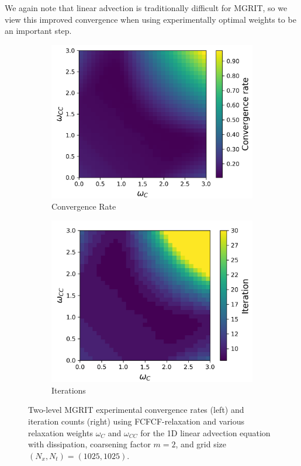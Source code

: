 \documentclass[VANCOUVER,STIX1COL]{WileyNJD-v2}
\begin{document}
We again note that linear advection is traditionally difficult for MGRIT, so we view this improved convergence 
when using experimentally optimal weights to be an important step. 

\begin{figure}[h!]
    \centering
    \begin{subfigure}[b]{0.4\textwidth}
    \includegraphics[width=\textwidth]{images/Advc1D_U_1025_Conv.png}
    \caption{\normalsize Convergence Rate}
    \label{fig:LA Conv WDiss}
    \end{subfigure}
     \begin{subfigure}[b]{0.4\textwidth}
    \includegraphics[width=\textwidth]{images/Advc1D_U_1025_Iter.png}
    \caption{\normalsize Iterations}
    \label{fig:LA Iter WDiss}
    \end{subfigure}
    \caption{Two-level MGRIT experimental convergence rates (left) and iteration counts (right) using FCFCF-relaxation and various 
    relaxation weights $\omega_C$ and $\omega_{CC}$ for the 1D linear advection equation with dissipation, coarsening factor $m=2$, and grid size $(N_x, N_t) = (1025, 1025)$. }
\end{figure}
\end{document}
